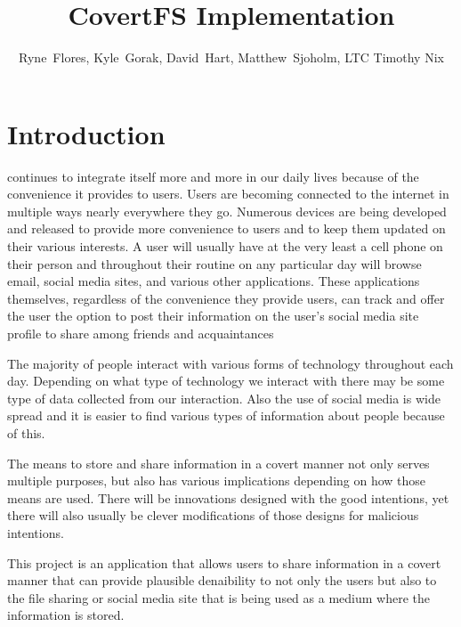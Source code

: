 \documentclass[12pt,journal,compsoc]{IEEEtran}
\title{CovertFS Implementation}
\author{Ryne~Flores, Kyle~Gorak, David~Hart, Matthew~Sjoholm, LTC Timothy Nix \\ \IEEEmembership{Department of Electrical Engineering and Computer Science\\ United States Military Academy}}
\date{}
\begin{document}
\maketitle

\section{Introduction}


 continues to integrate itself more and more in our daily lives because of the convenience it provides to users. Users are becoming connected to the internet in multiple ways nearly everywhere they go. Numerous devices are being developed and released to provide more convenience to users and to keep them updated on their various interests. A user will usually have at the very least a cell phone on their person and throughout their routine on any particular day will browse email, social media sites, and various other applications. These applications themselves, regardless of the convenience they provide users, can track and offer the user the option to post their information on the user's social media site profile to share among friends and acquaintances 

The majority of people interact with various forms of technology throughout each day. Depending on what type of technology we interact with there may be some type of data collected from our interaction. Also the use of social media is wide spread and it is easier to find various types of information about people because of this. 

The means to store and share information in a covert manner not only serves multiple purposes, but also has various implications depending on how those means are used. There will be innovations designed with the good intentions, yet there will also usually be clever modifications of those designs for malicious intentions.

This project is an application that allows users to share information in a covert manner that can provide plausible denaibility to not only the users but also to the file sharing or social media site that is being used as a medium where the information is stored.
\end{document}
